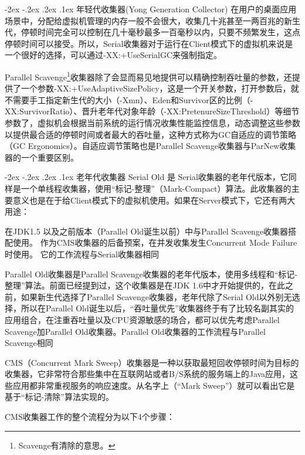 \documentclass[8pt]{book}
\makeatletter
\numberwithin{dummy}{section}
\theoremstyle{ocrenumbox}
\theoremstyle{blacknumex}
\theoremstyle{blacknumbox}
\theoremstyle{ocrenum}
\renewcommand\paragraph{\@startsection{paragraph}{4}{\z@}
	{-2ex \@plus-.2ex \@minus .2ex}
	{.1ex}
	{\normalfont\small\sffamily\bfseries}}
\makeatother
\begin{document}
\paragraph{年轻代收集器(Yong Generation Collector)}
在用户的桌面应用场景中，分配给虚拟机管理的内存一般不会很大，收集几十兆甚至一两百兆的新生代，停顿时间完全可以控制在几十毫秒最多一百毫秒以内，只要不频繁发生，这点停顿时间可以接受。所以，Serial收集器对于运行在Client模式下的虚拟机来说是一个很好的选择，可以通过-XX:+UseSerialGC来强制指定。

Parallel Scavenge\footnote{Scavenge有清除的意思。}收集器除了会显而易见地提供可以精确控制吞吐量的参数，还提供了一个参数-XX:+UseAdaptiveSizePolicy，这是一个开关参数，打开参数后，就不需要手工指定新生代的大小（-Xmn）、Eden和Survivor区的比例（-XX:SurvivorRatio）、晋升老年代对象年龄（-XX:PretenureSizeThreshold）等细节参数了，虚拟机会根据当前系统的运行情况收集性能监控信息，动态调整这些参数以提供最合适的停顿时间或者最大的吞吐量，这种方式称为GC自适应的调节策略（GC Ergonomics）。自适应调节策略也是Parallel Scavenge收集器与ParNew收集器的一个重要区别。

\paragraph{老年代收集器}
Serial Old 是 Serial收集器的老年代版本，它同样是一个单线程收集器，使用“标记-整理”（Mark-Compact）算法。此收集器的主要意义也是在于给Client模式下的虚拟机使用。如果在Server模式下，它还有两大用途：

在JDK1.5 以及之前版本（Parallel Old诞生以前）中与Parallel Scavenge收集器搭配使用。
作为CMS收集器的后备预案，在并发收集发生Concurrent Mode Failure时使用。
它的工作流程与Serial收集器相同

Parallel Old收集器是Parallel Scavenge收集器的老年代版本，使用多线程和“标记-整理”算法。前面已经提到过，这个收集器是在JDK 1.6中才开始提供的，在此之前，如果新生代选择了Parallel Scavenge收集器，老年代除了Serial Old以外别无选择，所以在Parallel Old诞生以后，“吞吐量优先”收集器终于有了比较名副其实的应用组合，在注重吞吐量以及CPU资源敏感的场合，都可以优先考虑Parallel Scavenge加Parallel Old收集器。Parallel Old收集器的工作流程与Parallel Scavenge相同


CMS（Concurrent Mark Sweep）收集器是一种以获取最短回收停顿时间为目标的收集器，它非常符合那些集中在互联网站或者B/S系统的服务端上的Java应用，这些应用都非常重视服务的响应速度。从名字上（“Mark Sweep”）就可以看出它是基于“标记-清除”算法实现的。

CMS收集器工作的整个流程分为以下4个步骤：
\end{document}
